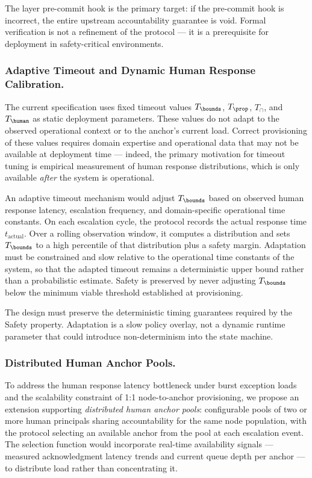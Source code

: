 The \fact{} layer pre-commit hook is the primary target: if the pre-commit hook is incorrect, the entire upstream accountability guarantee is void. Formal verification is not a refinement of the protocol --- it is a prerequisite for deployment in safety-critical environments.

\subsubsection{Adaptive Timeout and Dynamic Human Response Calibration.}

The current specification uses fixed timeout values $T_{\bounds}$, $T_{\prop}$, $T_{\cap}$, and $T_{\human}$ as static deployment parameters. These values do not adapt to the observed operational context or to the anchor's current load. Correct provisioning of these values requires domain expertise and operational data that may not be available at deployment time --- indeed, the primary motivation for timeout tuning is empirical measurement of human response distributions, which is only available \emph{after} the system is operational.

An adaptive timeout mechanism would adjust $T_{\bounds}$ based on observed human response latency, escalation frequency, and domain-specific operational time constants. On each escalation cycle, the protocol records the actual response time $t_{\mathrm{actual}}$. Over a rolling observation window, it computes a distribution and sets $T_{\bounds}$ to a high percentile of that distribution plus a safety margin. Adaptation must be constrained and slow relative to the operational time constants of the system, so that the adapted timeout remains a deterministic upper bound rather than a probabilistic estimate. Safety is preserved by never adjusting $T_{\bounds}$ below the minimum viable threshold established at provisioning.

The design must preserve the deterministic timing guarantees required by the Safety property. Adaptation is a slow policy overlay, not a dynamic runtime parameter that could introduce non-determinism into the state machine.

\subsubsection{Distributed Human Anchor Pools.}

To address the human response latency bottleneck under burst exception loads and the scalability constraint of 1:1 node-to-anchor provisioning, we propose an extension supporting \emph{distributed human anchor pools}: configurable pools of two or more human principals sharing accountability for the same node population, with the protocol selecting an available anchor from the pool at each escalation event. The selection function would incorporate real-time availability signals --- measured acknowledgment latency trends and current queue depth per anchor --- to distribute load rather than concentrating it.

